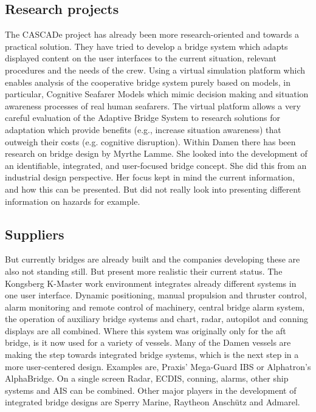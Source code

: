 \subsection{Research projects}
The CASCADe project has already been more research-oriented and towards a practical solution. They have tried to develop a bridge system which adapts displayed content on the user interfaces to the current situation, relevant procedures and the needs of the crew. Using a virtual simulation platform which enables analysis of the cooperative bridge system purely based on models, in particular, Cognitive Seafarer Models which mimic decision making and situation awareness processes of real human seafarers. The virtual platform allows a very careful evaluation of the Adaptive Bridge System to research solutions for adaptation which provide benefits (e.g., increase situation awareness) that outweigh their costs (e.g. cognitive disruption).\cite{CASCADe2015}
Within Damen there has been research on bridge design by Myrthe Lamme. She looked into the development of an identifiable, integrated, and user-focused bridge concept. She did this from an industrial design perspective. Her focus kept in mind the current information, and how this can be presented. But did not really look into presenting different information on hazards for example.


\subsection{Suppliers}
But currently bridges are already built and the companies developing these are also not standing still. But present more realistic their current status. The Kongsberg K-Master work environment integrates already different systems in one user interface. Dynamic positioning, manual propulsion and thruster control, alarm monitoring and remote control of machinery, central bridge alarm system, the operation of auxiliary bridge systems and chart, radar, autopilot and conning displays are all combined. Where this system was originally only for the aft bridge, is it now used for a variety of vessels. \cite{Kongsberg2017}
Many of the Damen vessels are making the step towards integrated bridge systems, which is the next step in a more user-centered design. Examples are, Praxis' Mega-Guard IBS or Alphatron's AlphaBridge. On a single screen Radar, ECDIS, conning, alarms, other ship systems and AIS can be combined. 
Other major players in the development of integrated bridge designs are Sperry Marine, Raytheon Anschütz and Admarel.

